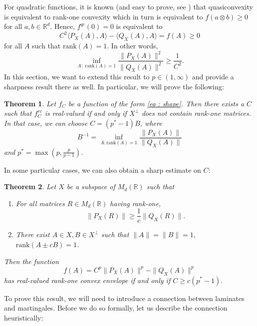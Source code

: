 \documentclass[11pt, a4paper, reqno]{elsarticle}
\newtheorem{theorem}{Theorem}[section]
\theoremstyle{definition}
\theoremstyle{remark}
\begin{document}
For quadratic functions, it is known (and easy to prove, see
\cite[Theorem 5.25(i)]{Dacorogna2008DirectVariations}) that
quasiconvexity is equivalent to rank-one convexity which in turn is 
equivalent to $f(a\otimes b)\ge 0$ for all $a,b\in\mathbb{R}^d$. Hence, 
$f^{qc}(0)=0$ is equivalent to
\begin{equation*}
	C^2\langle P_X(A),A\rangle
-
	\langle Q_X(A), A\rangle
=
	f(A)
\ge
	 0
\end{equation*}
for all $A$ such that $\mathrm{rank}(A)=1$. In other words,
\begin{equation*}
	\inf_{A\, \colon \, \mathrm{rank}(A)=1}
	\frac{\|P_X(A)\|^2}{\|Q_X(A)\|^2}
\ge
	\frac1{C^2}.
\end{equation*}
In this section, we want to extend this result to $p\in (1,\infty)$
and provide a sharpness result there as well.
In particular, we will prove the following:
\begin{theorem}\label{thm : mainthm}
Let $f_C$ be a function of the form \eqref{eq : shape}.
Then there exists a $C$ such that $f_C^{rc}$ is real-valued
if and only if $X^\perp$ does not contain rank-one matrices.
In that case, we can choose $C=(p^*-1)B$,
where 
\begin{equation*}
	B^{-1}
=
	\inf_{A\colon \mathrm{rank}(A)=1}
	\frac{\|P_X(A)\|}{\|Q_X(A)\|}
\end{equation*}
and $p^*=\max\left(p,\frac{p}{p-1}\right)$.
\end{theorem}
In some particular cases,
we can also obtain a sharp estimate on $C$:
\begin{theorem}\label{thm : sharp}
Let $X$ be a subspace of $M_d(\mathbb{R})$
such that 
\begin{enumerate}
\item For all matrices $R\in M_d(\mathbb{R})$ having rank-one, 
\begin{equation*}
	\|P_X(R)\|
\ge
	\frac1c\|Q_X(R)\|.
\end{equation*}
\item There exist  $A\in X, B\in X^\perp$ such that $\|A\|=\|B\|=1$,
$\mathrm{rank}(A\pm cB)=1$.
\end{enumerate}
Then the function
\begin{equation*}
	f(A)
=
	C^p\| P_X(A)\|^p
-
	\| Q_X(A)\|^p
\end{equation*}
has real-valued rank-one convex envelope
if and only if $C\ge c(p^*-1).$
\end{theorem}
To prove this result, we will need to introduce a connection between laminates and martingales.
Before we do so formally, let us describe the connection heuristically:
\end{document}
